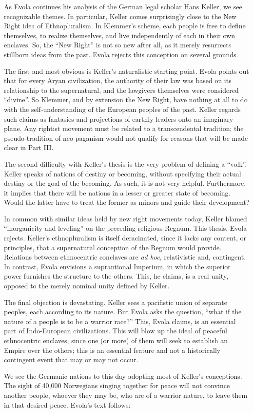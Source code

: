 \begin{quotationx}
As Evola continues his analysis of the German legal scholar Hans Keller, we see recognizable themes. In particular, Keller comes surprisingly close to the New Right idea of Ethnopluralism. In Klemmer's scheme, each people is free to define themselves, to realize themselves, and live independently of each in their own enclaves. So, the ``New Right'' is not so new after all, as it merely resurrects stillborn ideas from the past. Evola rejects this conception on several grounds.

The first and most obvious is Keller's naturalistic starting point. Evola points out that for every Aryan civilization, the authority of their law was based on its relationship to the supernatural, and the lawgivers themselves were considered ``divine''. So Klemmer, and by extension the New Right, have nothing at all to do with the self-understanding of the European peoples of the past. Keller regards such claims as fantasies and projections of earthly leaders onto an imaginary plane. Any rightist movement must be related to a transcendental tradition; the pseudo-tradition of neo-paganism would not qualify for reasons that will be made clear in Part III.

The second difficulty with Keller's thesis is the very problem of defining a ``volk''. Keller speaks of nations of destiny or becoming, without specifying their actual destiny or the goal of the becoming. As such, it is not very helpful. Furthermore, it implies that there will be nations in a lesser or greater state of becoming. Would the latter have to treat the former as minors and guide their development?

In common with similar ideas held by new right movements today, Keller blamed ``inorganicity and leveling'' on the preceding religious Regnum. This thesis, Evola rejects. Keller's ethnopluralism is itself deracinated, since it lacks any content, or principles, that a supernatural conception of the Regnum would provide. Relations between ethnocentric conclaves are \emph{ad hoc}, relativistic and, contingent. In contrast, Evola envisions a suprantional Imperium, in which the superior power furnishes the structure to the others. This, he claims, is a real unity, opposed to the merely nominal unity defined by Keller.

The final objection is devastating. Keller sees a pacifistic union of separate peoples, each according to its nature. But Evola asks the question, ``what if the nature of a people is to be a warrior race?'' This, Evola claims, is an essential part of Indo-European civilizations. This will blow up the ideal of peaceful ethnocentric enclaves, since one (or more) of them will seek to establish an Empire over the others; this is an essential feature and not a historically contingent event that may or may not occur.

We see the Germanic nations to this day adopting most of Keller's conceptions. The sight of 40,000 Norwegians singing together for peace will not convince another people, whoever they may be, who are of a warrior nature, to leave them in that desired peace. Evola's text follows:
\end{quotationx}


